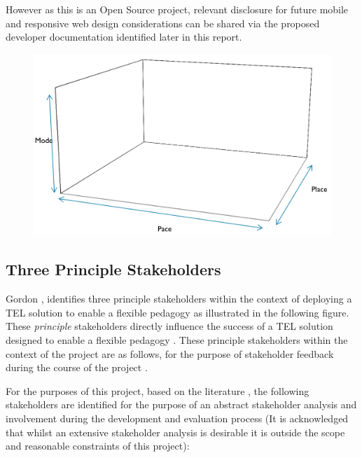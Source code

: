 \begin{itemize}[\null]
\begin{itemize}
However as this is an Open Source project, relevant disclosure for future mobile and responsive web design considerations can be shared via the proposed developer documentation identified later in this report.

\end{itemize}
\end{itemize}



\begin{figure}[H]
	\centering
	\includegraphics[scale=0.35]{figures/flexibleDesign}
	\label{fig:Flexible Pedagogy Design Considerations for TEL}
\end{figure}

\label{sec:sec01}
\subsection{Three Principle Stakeholders}
\label{subsec:subsec01}

Gordon \cite{Gordon2014}, identifies three principle stakeholders within the context of deploying  a TEL solution to enable a flexible pedagogy as illustrated in the following figure. These \textit{principle} stakeholders directly influence the success of a TEL solution designed to enable a flexible pedagogy \cite{Gordon2014}. These principle stakeholders within the context of the project are as follows, for the purpose of stakeholder feedback during the course of the project .

For the purposes of this project, based on the literature \cite{Gordon2014}, the following stakeholders are identified for the purpose of an abstract stakeholder analysis and involvement during the development and evaluation process (It is acknowledged that whilst an extensive stakeholder analysis is desirable it is outside the scope and reasonable constraints of this project):

